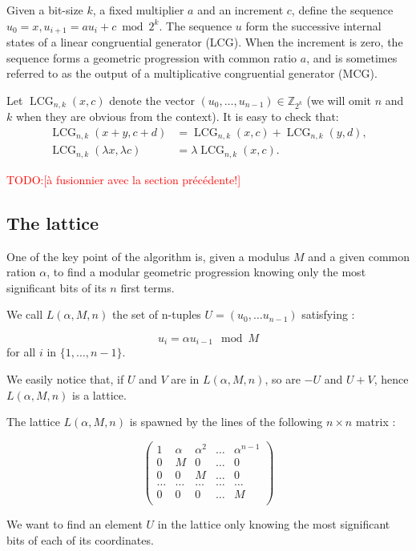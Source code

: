 \documentclass[preprint,svgnames]{iacrtrans}
\DeclareMathOperator{\LCG}{LCG}
\newcommand{\todo}[1]{\textcolor{red}{TODO:[#1]}}
\begin{document}
Given a bit-size $k$, a fixed multiplier $a$ and an increment $c$, define the
sequence $u_0 = x, u_{i+1} = a u_i + c \bmod 2^k$. The sequence $u$ form the
successive internal states of a linear congruential generator (LCG). When the
increment is zero, the sequence forms a geometric progression with common ratio
$a$, and is sometimes referred to as the output of a multiplicative congruential
generator (MCG).

Let $\LCG_{n,k}(x, c)$ denote the vector
$(u_0, \dots, u_{n-1}) \in \mathbb{Z}_{2^k}$ (we will omit $n$ and $k$ when they
are obvious from the context).  It is easy to check that:
\begin{align}
  \label{eq:lcg-additive}
  \LCG_{n,k}(x + y, c + d) &= \LCG_{n,k}(x, c) + \LCG_{n,k}(y, d),  \\
  \label{eq:lcg-scalar}
  \LCG_{n,k}(\lambda x, \lambda c) &= \lambda \LCG_{n,k}(x, c).   
\end{align}



\todo{à fusionnier avec la section précédente!}
\subsection{The lattice}

One of the key point of the algorithm is, given a modulus \(M\) and a given common ration \(\alpha\), to find a modular geometric progression knowing only the most significant bits of its \(n\) first terms.

We call \(L(\alpha,M,n)\) the set of n-tuples \(U = (u_0,\dots u_{n-1})\) satisfying :

\[u_{i} = \alpha u_{i-1} \mod M \] for all \(i\) in \(\{1,\dots,n-1\}\).


We easily notice that, if \(U\) and \(V\) are in \(L(\alpha,M,n)\), so are \(-U\) and \(U+V\), hence \(L(\alpha,M,n)\) is a lattice.

The lattice \(L(\alpha,M,n)\) is spawned by the lines of the following \(n\times n\) matrix :

\[\begin{pmatrix}
1&\alpha&\alpha^2&\dots&\alpha^{n-1}\\
0&M&0&\dots&0\\
0&0&M&\dots&0\\
\dots&\dots&\dots&\dots&\dots\\
0&0&0&\dots&M\\
\end{pmatrix}\]

We want to find an element \(U\) in the lattice only knowing the most significant bits of each of its coordinates. 
\end{document}
